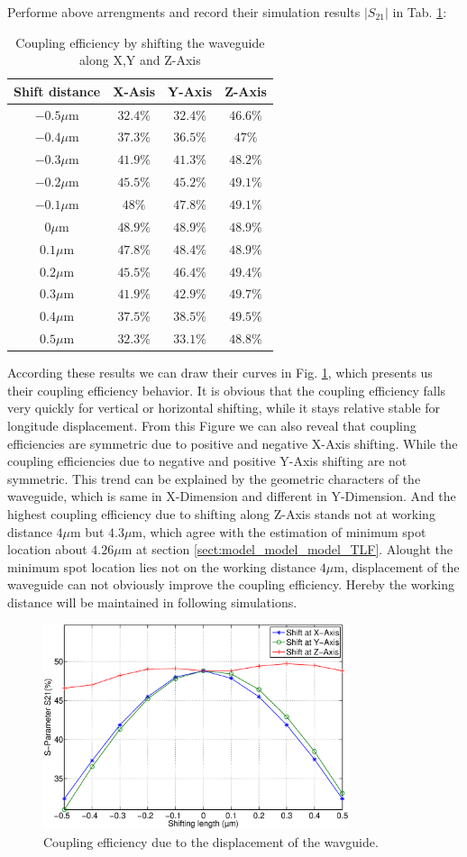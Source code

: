 Performe above arrengments and record their simulation results $|S_{21}|$ in Tab. \ref{tab:shift_result}:
\begin{table}
\caption{Coupling efficiency by shifting the waveguide along X,Y and Z-Axis}
\centering
\begin{tabular}{c|ccc}
\hline
Shift distance & X-Asis & Y-Axis & Z-Axis \\
\hline
$-0.5\mu$m 		&$32.4\%$	&$32.4\%$&$46.6\%$	\\
$-0.4\mu$m		&$37.3\%$	&$36.5\%$&$47\%$	\\
$-0.3\mu$m 		&$41.9\%$	&$41.3\%$&$48.2\%$	\\
$-0.2\mu$m	  &$45.5\%$	&$45.2\%$&$49.1\%$	\\
$-0.1\mu$m		&$48\%$	&$47.8\%$&$49.1\%$	\\
$0\mu$m			  &$48.9\%$	&$48.9\%$&$48.9\%$	\\
$0.1\mu$m			&$47.8\%$	&$48.4\%$&$48.9\%$	\\
$0.2\mu$m			&$45.5\%$	&$46.4\%$&$49.4\%$	\\
$0.3\mu$m			&$41.9\%$	&$42.9\%$&$49.7\%$	\\
$0.4\mu$m			&$37.5\%$	&$38.5\%$&$49.5\%$	\\
$0.5\mu$m			&$32.3\%$	&$33.1\%$&$48.8\%$	\\
\hline
\end{tabular}
\label{tab:shift_result}
\end{table}
According these results we can draw their curves in Fig. \ref{fig:shift_curve}, which presents us their coupling efficiency behavior. It is obvious that the coupling efficiency falls very quickly for vertical or horizontal shifting, while it stays relative stable for longitude displacement. From this Figure we can also reveal that coupling efficiencies are symmetric due to positive and negative X-Axis shifting. While the coupling efficiencies due to negative and positive Y-Axis shifting are not symmetric. This trend can be explained by the geometric characters of the waveguide, which is same in X-Dimension and different in Y-Dimension. And the highest coupling efficiency due to shifting along Z-Axis stands not at working distance $4\mu$m but $4.3\mu$m, which agree with the estimation of minimum spot location about $4.26\mu$m at section \ref{sect:model_model_model_TLF}. Alought the minimum spot location lies not on the working distance $4\mu$m, displacement of the waveguide can not obviously improve the coupling efficiency. Hereby the working distance will be maintained in following simulations.
  
\begin{figure}[!ht]
\centering
\includegraphics[width=0.8\textwidth]{bilder/shift_curve}
\caption{Coupling efficiency due to the displacement of the wavguide.}
\label{fig:shift_curve}
\end{figure}
